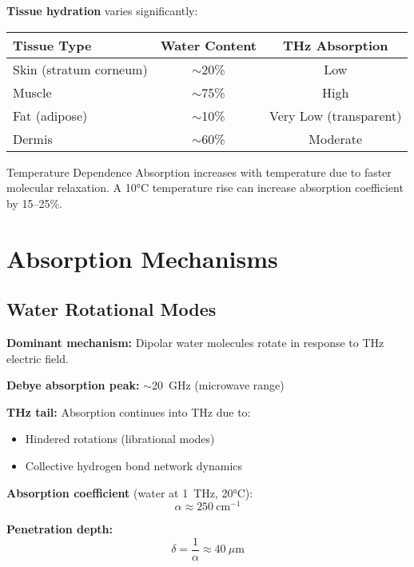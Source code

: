 \textbf{Tissue hydration} varies significantly:

\begin{center}
\begin{tabular}{@{}lcc@{}}
\toprule
Tissue Type & Water Content & THz Absorption \\
\midrule
Skin (stratum corneum) & $\sim$20\% & Low \\
Muscle & $\sim$75\% & High \\
Fat (adipose) & $\sim$10\% & Very Low (transparent) \\
Dermis & $\sim$60\% & Moderate \\
\bottomrule
\end{tabular}
\end{center}

\begin{calloutbox}{Temperature Dependence}
Absorption increases with temperature due to faster molecular relaxation. A 10°C temperature rise can increase absorption coefficient by 15--25\%.
\end{calloutbox}

\section{Absorption Mechanisms}
\label{sec:absorption-mechanisms}

\subsection{Water Rotational Modes}
\label{subsec:water-rotational}

\textbf{Dominant mechanism:} Dipolar water molecules rotate in response to THz electric field.

\textbf{Debye absorption peak:} $\sim$20~GHz (microwave range)

\textbf{THz tail:} Absorption continues into THz due to:
\begin{itemize}
\item Hindered rotations (librational modes)
\item Collective hydrogen bond network dynamics
\end{itemize}

\textbf{Absorption coefficient} (water at 1~THz, 20°C):
\begin{equation}
\label{eq:water-absorption-1thz}
\alpha \approx 250~\text{cm}^{-1}
\end{equation}

\textbf{Penetration depth:}
\begin{equation}
\label{eq:penetration-depth-water}
\delta = \frac{1}{\alpha} \approx 40~\mu\text{m}
\end{equation}

